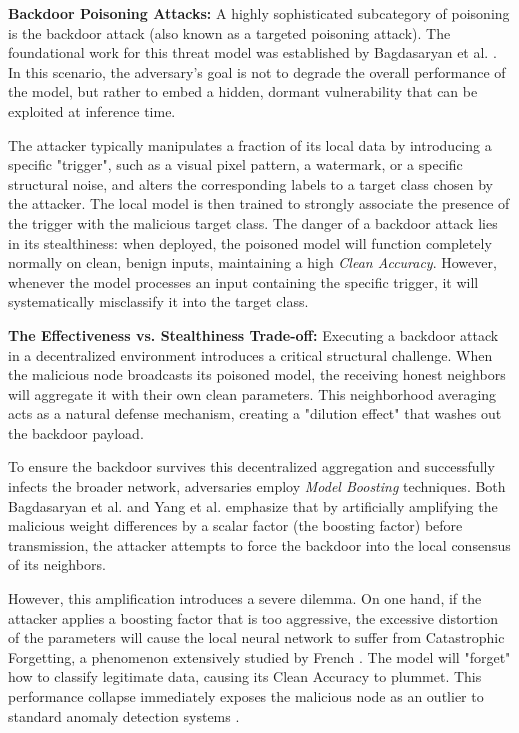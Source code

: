\textbf{Backdoor Poisoning Attacks:}
A highly sophisticated subcategory of poisoning is the backdoor attack (also known as a targeted poisoning attack). The foundational work for this threat model was established by Bagdasaryan et al. \cite{bagdasaryan2020how}. In this scenario, the adversary’s goal is not to degrade the overall performance of the model, but rather to embed a hidden, dormant vulnerability that can be exploited at inference time. 

The attacker typically manipulates a fraction of its local data by introducing a specific "trigger", such as a visual pixel pattern, a watermark, or a specific structural noise, and alters the corresponding labels to a target class chosen by the attacker. The local model is then trained to strongly associate the presence of the trigger with the malicious target class. The danger of a backdoor attack lies in its stealthiness: when deployed, the poisoned model will function completely normally on clean, benign inputs, maintaining a high \textit{Clean Accuracy}. However, whenever the model processes an input containing the specific trigger, it will systematically misclassify it into the target class.

\textbf{The Effectiveness vs. Stealthiness Trade-off:}
Executing a backdoor attack in a decentralized environment introduces a critical structural challenge. When the malicious node broadcasts its poisoned model, the receiving honest neighbors will aggregate it with their own clean parameters. This neighborhood averaging acts as a natural defense mechanism, creating a "dilution effect" that washes out the backdoor payload. 

To ensure the backdoor survives this decentralized aggregation and successfully infects the broader network, adversaries employ \textit{Model Boosting} techniques. Both Bagdasaryan et al. \cite{bagdasaryan2020how} and Yang et al. \cite{yang2025stealthy} emphasize that by artificially amplifying the malicious weight differences by a scalar factor (the boosting factor) before transmission, the attacker attempts to force the backdoor into the local consensus of its neighbors. 

However, this amplification introduces a severe dilemma. On one  hand, if the attacker applies a boosting factor that is too aggressive, the excessive distortion of the parameters will cause the local neural network to suffer from Catastrophic Forgetting, a phenomenon extensively studied by French \cite{french1999catastrophic}. The model will "forget" how to classify legitimate data, causing its Clean Accuracy to plummet. This performance collapse immediately exposes the malicious node as an outlier to standard anomaly detection systems \cite{xia2023poisoning}. 

